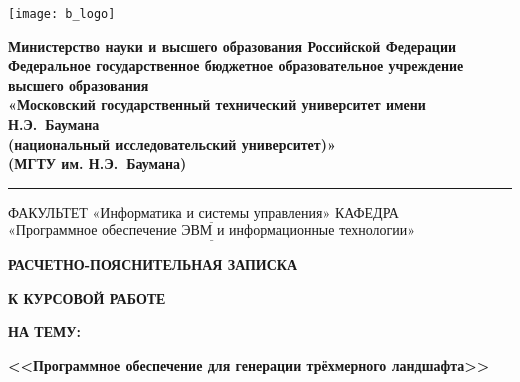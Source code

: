 \thispagestyle{empty}

\noindent \begin{minipage}{0.15\textwidth}
	\texttt{[image: b\_logo]}
\end{minipage}
\noindent\begin{minipage}{0.85\textwidth}\centering
	\textbf{Министерство науки и высшего образования Российской Федерации}\\
	\textbf{Федеральное государственное бюджетное образовательное учреждение высшего образования}\\
	\textbf{«Московский государственный технический университет имени Н.Э.~Баумана}\\
	\textbf{(национальный исследовательский университет)»}\\
	\textbf{(МГТУ им. Н.Э.~Баумана)}
\end{minipage}

\noindent\rule{\linewidth}{3pt}
\newline\newline
\noindent ФАКУЛЬТЕТ $\underline{\text{«Информатика и системы управления»}}$ \newline\newline
\noindent КАФЕДРА $\underline{\text{«Программное обеспечение ЭВМ и информационные технологии»}}$

\vspace{1cm}

\begin{center}
	\noindent\centering
		\Large\textbf{РАСЧЕТНО-ПОЯСНИТЕЛЬНАЯ ЗАПИСКА}
\end{center}

\begin{center}
	\noindent\centering
	\Large\textbf{К КУРСОВОЙ РАБОТЕ}
\end{center}

\begin{center}
	\noindent\centering
		\Large\textbf{НА ТЕМУ:}
\end{center}

\begin{center}
	\noindent\centering
	\Large\textbf{<<Программное обеспечение для генерации трёхмерного ландшафта>>}
\end{center}

\vfill
\vfill
\vfill
\vfill

